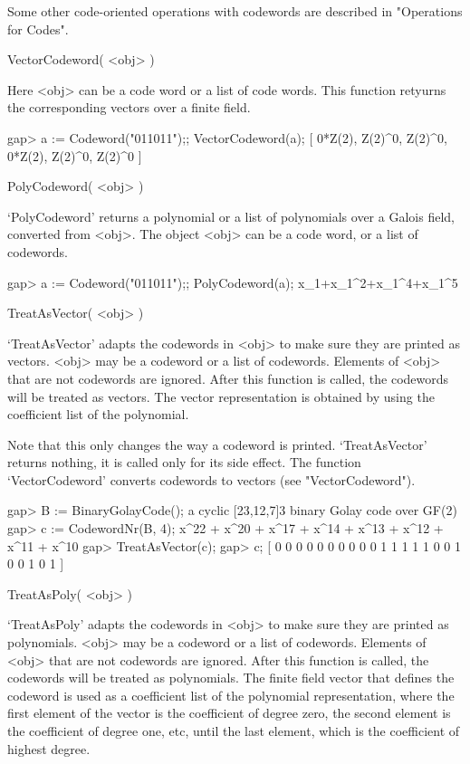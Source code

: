 Some other   code-oriented  operations with  codewords are   described in
"Operations for Codes".


\>VectorCodeword( <obj> )

Here <obj> can be a code word or a list of code words. This function
retyurns the corresponding vectors over a finite field.

\beginexample
gap> a := Codeword("011011");; VectorCodeword(a);
[ 0*Z(2), Z(2)^0, Z(2)^0, 0*Z(2), Z(2)^0, Z(2)^0 ]
\endexample

\>PolyCodeword( <obj> )

`PolyCodeword' returns  a  polynomial or a  list   of polynomials over  a
Galois field, converted from <obj>.  The object <obj>  can be a code word, or
a list of codewords.

\beginexample
gap> a := Codeword("011011");; PolyCodeword(a);
x_1+x_1^2+x_1^4+x_1^5
\endexample


\>TreatAsVector( <obj> )

`TreatAsVector' adapts the  codewords  in  <obj>  to make sure  they  are
printed as   vectors.    <obj> may   be    a  codeword   or a    list  of
codewords.  Elements of <obj> that are   not codewords are ignored. After
this function  is called, the codewords will  be  treated as vectors. The
vector representation is  obtained by using the  coefficient list of  the
polynomial.

Note that    this only  changes   the   way    a codeword   is   printed.
`TreatAsVector' returns nothing, it  is called only  for its side effect.
The   function  `VectorCodeword' converts    codewords to  vectors   (see
"VectorCodeword").

\beginexample
gap> B := BinaryGolayCode();
a cyclic [23,12,7]3 binary Golay code over GF(2)
gap> c := CodewordNr(B, 4);
x^22 + x^20 + x^17 + x^14 + x^13 + x^12 + x^11 + x^10
gap> TreatAsVector(c);
gap> c;
[ 0 0 0 0 0 0 0 0 0 0 1 1 1 1 1 0 0 1 0 0 1 0 1 ] 
\endexample

\>TreatAsPoly( <obj> )

`TreatAsPoly' adapts the codewords in <obj> to make sure they are printed
as polynomials. <obj> may be a codeword or a  list of codewords. Elements
of <obj> that  are  not codewords are  ignored.  After  this  function is
called, the codewords will  be treated as  polynomials. The finite  field
vector that defines  the codeword is  used as a  coefficient list of  the
polynomial representation,  where the first element  of the vector is the
coefficient  of degree zero,   the second element   is the coefficient of
degree one,  etc,  until the last element,   which is the  coefficient of
highest degree.

